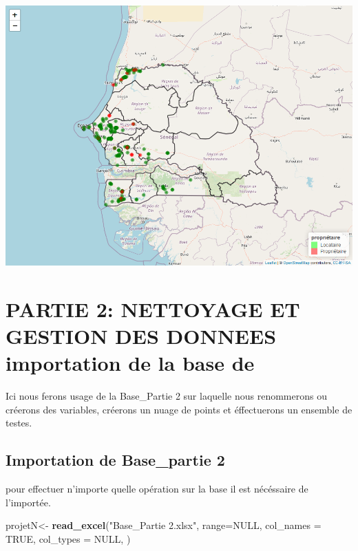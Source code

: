 \documentclass[
]{article}
\newenvironment{Shaded}{\begin{snugshade}}{\end{snugshade}}
\newcommand{\AttributeTok}[1]{\textcolor[rgb]{0.13,0.29,0.53}{#1}}
\newcommand{\ConstantTok}[1]{\textcolor[rgb]{0.56,0.35,0.01}{#1}}
\newcommand{\FunctionTok}[1]{\textcolor[rgb]{0.13,0.29,0.53}{\textbf{#1}}}
\newcommand{\NormalTok}[1]{#1}
\newcommand{\OtherTok}[1]{\textcolor[rgb]{0.56,0.35,0.01}{#1}}
\newcommand{\StringTok}[1]{\textcolor[rgb]{0.31,0.60,0.02}{#1}}
\begin{document}
\includegraphics{TP-R-ESSAI_files/figure-latex/unnamed-chunk-11-1.png}

\hypertarget{partie-2-nettoyage-et-gestion-des-donnees-importation-de-la-base-de}{%
\section{PARTIE 2: NETTOYAGE ET GESTION DES DONNEES importation de la
base
de}\label{partie-2-nettoyage-et-gestion-des-donnees-importation-de-la-base-de}}

Ici nous ferons usage de la Base\_Partie 2 sur laquelle nous renommerons
ou créerons des variables, créerons un nuage de points et éffectuerons
un ensemble de testes.

\hypertarget{importation-de-base_partie-2}{%
\subsection{Importation de Base\_partie
2}\label{importation-de-base_partie-2}}

pour effectuer n'importe quelle opération sur la base il est nécéssaire
de l'importée.

\begin{Shaded}
\begin{Highlighting}[]
\NormalTok{projetN}\OtherTok{\textless{}{-}} \FunctionTok{read\_excel}\NormalTok{(}\StringTok{"Base\_Partie 2.xlsx"}\NormalTok{,}
                    \AttributeTok{range=}\ConstantTok{NULL}\NormalTok{,}
                    \AttributeTok{col\_names =} \ConstantTok{TRUE}\NormalTok{,}
                    \AttributeTok{col\_types =} \ConstantTok{NULL}\NormalTok{,}
\NormalTok{                    )}
\end{Highlighting}
\end{Shaded}
\end{document}
